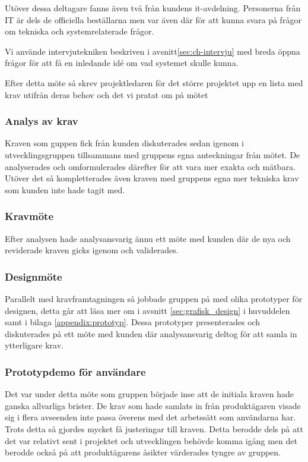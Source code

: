 Utöver dessa deltagare fanns även två från kundens it-avdelning. Personerna från IT är dels de officiella beställarna men var även där för att kunna svara på frågor om tekniska och systemrelaterade frågor.

Vi använde intervjutekniken beskriven i avsnitt\ref{sec:ch-intervju} med breda öppna frågor för att få en inledande idé om vad systemet skulle kunna.

Efter detta möte så skrev projektledaren för det större projektet upp en lista med krav utifrån deras behov och det vi pratat om på mötet

\subsubsection{Analys av krav}
Kraven som guppen fick från kunden diskuterades sedan igenom i utvecklingsgruppen tillsammans med gruppens egna anteckningar från mötet. De analyserades och omformulerades därefter för att vara mer exakta och mätbara. Utöver det så kompletterades även kraven med gruppens egna mer tekniska krav som kunden inte hade tagit med.

\subsubsection{Kravmöte}
Efter analysen hade analysansvarig ännu ett möte med kunden där de nya och reviderade kraven gicks igenom och validerades.

\subsubsection{Designmöte}
Parallelt med kravframtagningen så jobbade gruppen på med olika prototyper för designen, detta går att läsa mer om i avsnitt \ref{sec:grafisk_design} i huvuddelen samt i bilaga \ref{appendix:prototyp}.
Dessa prototyper presenterades och diskuterades på ett möte med kunden där analysansvarig deltog för att samla in ytterligare krav.

\subsubsection{Prototypdemo för användare}
Det var under detta möte som gruppen började inse att de initiala kraven hade ganska allvarliga brister. De krav som hade samlats in från produktägaren visade sig i flera avseenden inte passa överens med det arbetssätt som användarna har. Trots detta så gjordes mycket få justeringar till kraven. Detta berodde dels på att det var relativt sent i projektet och utvecklingen behövde komma igång men det berodde också på att produktägarens åsikter värderades tyngre av gruppen.

